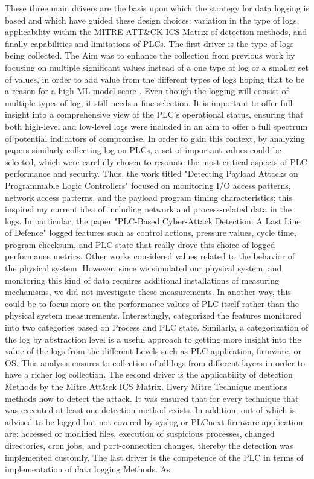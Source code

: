 \documentclass[Master,BMR,english]{twbook}
\begin{document}
These three main drivers are the basis upon which the strategy for data logging is based and which have guided these design choices: variation in the type of logs, applicability within the MITRE ATT\&CK ICS Matrix of detection methods, and finally capabilities and limitations of PLCs\cite{mitre_attack_ics}. The first driver is the type of logs being collected. The Aim was to enhance the collection from previous work by focusing on multiple significant values instead of a one type of log or a smaller set of values, in order to add value from the different types of logs hoping that to be a reason for a high ML model score \cite{ani_design_2021} \cite{mubarak_industrial_2022} \cite{nassif_machine_2021}. Even though the logging will consist of multiple types of log, it still needs a fine selection. It is important to offer full insight into a comprehensive view of the PLC's operational status, ensuring that both high-level and low-level logs were included in an aim to offer a full spectrum of potential indicators of compromise. In order to gain this context, by analyzing papers similarly collecting log on PLCs, a set of important values could be selected, which were carefully chosen to resonate the most critical aspects of PLC performance and security. Thus, the work titled "Detecting Payload Attacks on Programmable Logic Controllers" focused on monitoring I/O access patterns, network access patterns, and the payload program timing characteristics; this inspired my current idea of including network and process-related data in the logs\cite{yang_detecting_2018}. In particular, the paper "PLC-Based Cyber-Attack Detection: A Last Line of Defence" logged features such as control actions, pressure values, cycle time, program checksum, and PLC state that really drove this choice of logged performance metrics. Other works considered values related to the behavior of the physical system. However, since we simulated our physical system, and monitoring this kind of data requires additional installations of measuring mechanisms, we did not investigate these measurements. In another way, this could be to focus more on the performance values of PLC itself rather than the physical system measurements. Interestingly, \cite{allison_plc-based_nodate} categorized the features monitored into two categories based on Process and PLC state. Similarly, a categorization of the log by abstraction level is a useful approach to getting more insight into the value of the logs from the different Levels such as PLC application, firmware, or OS. This analysis ensures to collection of all logs from different layers in order to have a richer log collection. The second driver is the applicability of detection Methods by the Mitre Att\&ck ICS Matrix. Every Mitre Technique mentions methods how to detect the attack. It was ensured that for every technique that was executed at least one detection method exists\cite{mitre_attack_ics}. In addition, out of which is advised to be logged but not covered by syslog or PLCnext firmware application are: accessed or modified files, execution of suspicious processes, changed directories, cron jobs, and port-connection changes, thereby the detection was implemented customly. The last driver is the competence of the PLC in terms of implementation of data logging Methods. As 
\end{document}
